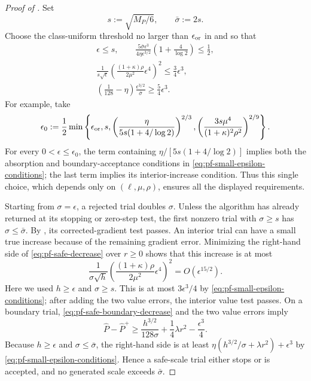 \documentclass{article}
\begin{document}
\begin{proof}[Proof of ]
Set
\[
 s:=\sqrt{M_P/6},
 \qquad
 \bar\sigma:=2s.
\]
Choose the class-uniform threshold no larger than
$\epsilon_{\rm or}$ in  and so that
\begin{equation}\label{eq:pf-small-epsilon-conditions}
\begin{gathered}
 \epsilon\le s,\qquad
 \frac{5\bar\sigma\epsilon^3}
 {4\eta\epsilon^{3/2}}
 \left(1+\frac4{\log2}\right)\le\frac12,\\
 \frac1{s\sqrt\epsilon}
 \left(\frac{(1+\kappa)\rho}{2\mu^2}\epsilon^4\right)^2
 \le\frac34\epsilon^3,\\
 \left(\frac1{128}-\eta\right)
 \frac{\epsilon^{3/2}}{\bar\sigma}
 \ge\frac54\epsilon^3.
\end{gathered}
\end{equation}
For example, take
\begin{equation}\label{eq:pf-class-uniform-onset}
 \epsilon_0:=\frac12\min\left\{
  \epsilon_{\rm or},s,
  \left(
   \frac{\eta}{5s(1+4/\log2)}
  \right)^{2/3},
  \left(
   \frac{3s\mu^4}{(1+\kappa)^2\rho^2}
  \right)^{2/9}
 \right\}.
\end{equation}
For every $0<\epsilon\le\epsilon_0$, the term containing
$\eta/[5s(1+4/\log2)]$ implies both the absorption and boundary-acceptance
conditions in \eqref{eq:pf-small-epsilon-conditions}; the last term
implies its interior-increase condition.  Thus this single choice,
which depends only on $(\ell,\mu,\rho)$, ensures all the displayed
requirements.

Starting from
$\sigma=\epsilon$, a rejected trial doubles $\sigma$.  Unless the
algorithm has already returned at its stopping or zero-step test, the
first nonzero trial with $\sigma\ge s$ has $\sigma\le\bar\sigma$.
By , its corrected-gradient test passes.  An
interior trial can have a small true increase because of the remaining
gradient error.  Minimizing the right-hand side of
\eqref{eq:pf-safe-decrease} over $r\ge0$ shows that this increase is at
most
\[
 \frac1{\sigma\sqrt h}
 \left(\frac{(1+\kappa)\rho}{2\mu^2}\epsilon^4\right)^2
 =O(\epsilon^{15/2}).
\]
Here we used $h\ge\epsilon$ and $\sigma\ge s$.  This is
at most $3\epsilon^3/4$ by
\eqref{eq:pf-small-epsilon-conditions}; after
adding the two value errors, the interior value test passes.  On a
boundary trial,
\eqref{eq:pf-safe-boundary-decrease} and the two value errors imply
\[
 \widehat P-\widehat P^+
 \ge\frac{h^{3/2}}{128\sigma}
     +\frac14\lambda r^2-\frac{\epsilon^3}{4}.
\]
Because $h\ge\epsilon$ and $\sigma\le\bar\sigma$, the right-hand side
is at least $\eta(h^{3/2}/\sigma+\lambda r^2)+\epsilon^3$ by
\eqref{eq:pf-small-epsilon-conditions}.  Hence a safe-scale trial
either stops or is
accepted, and no generated scale exceeds $\bar\sigma$.


\end{proof}
\end{document}
